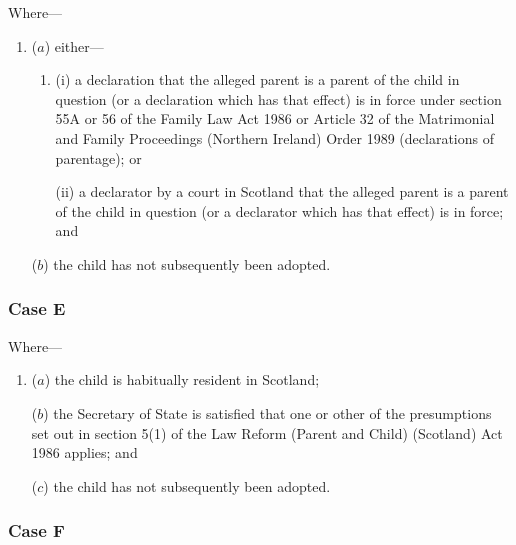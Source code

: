 \documentclass[12pt,a4paper]{article}
\begin{document}
Where---
\begin{enumerate}\item[]
($a$)
either---
\begin{enumerate}\item[]
 (i) a declaration that the alleged parent is a parent of the child in question (or a declaration which has that effect) is in force under section 55A or 56 of the Family Law Act 1986 or Article 32 of the Matrimonial and Family Proceedings (Northern Ireland) Order 1989 (declarations of parentage); or 

(ii) a declarator by a court in Scotland that the alleged parent is a parent of the child in question (or a declarator which has that effect) is in force; and
\end{enumerate}
($b$)
the child has not subsequently been adopted.
\end{enumerate}

%
%

\subsubsection*{Case E}

Where---
\begin{enumerate}\item[]
($a$) 
the child is habitually resident in Scotland; 

($b$) the Secretary of State is satisfied that one or other of the presumptions set out in section 5(1) of the Law Reform (Parent and Child) (Scotland) Act 1986 applies; and

($c$) the child has not subsequently been adopted.
\end{enumerate}

\subsubsection*{Case F}
\end{document}
